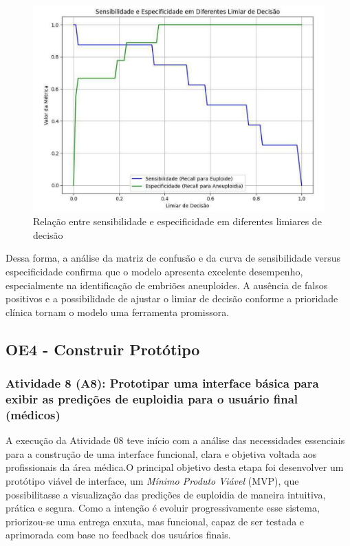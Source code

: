 \begin{figure}[h]
    \captionsetup{font=footnotesize, justification=centering, labelsep=period, position=above}
    \centering
    \includegraphics[scale=0.45]{figuras/IA/sensibilidade.pdf}
    \caption{Relação entre sensibilidade e especificidade em diferentes limiares de decisão}
    \label{fig:sensibilidade}
\end{figure}
\FloatBarrier

Dessa forma, a análise da matriz de confusão e da curva de sensibilidade versus especificidade confirma que o modelo apresenta excelente desempenho, especialmente na identificação de embriões aneuploides. A ausência de falsos positivos e a possibilidade de ajustar o limiar de decisão conforme a prioridade clínica tornam o modelo uma ferramenta promissora.

\subsection{OE4 - Construir Protótipo}
\subsubsection{Atividade 8 (A8): Prototipar uma interface básica para exibir as predições de euploidia para o usuário final (médicos)}
A execução da Atividade 08 teve início com a análise das necessidades essenciais para a construção de uma interface funcional, clara e objetiva voltada aos profissionais da área médica.O principal objetivo desta etapa foi desenvolver um protótipo viável de interface, um \textit{Mínimo Produto Viável} (MVP), que possibilitasse a visualização das predições de euploidia de maneira intuitiva, prática e segura. Como a intenção é evoluir progressivamente esse sistema, priorizou-se uma entrega enxuta, mas funcional, capaz de ser testada e aprimorada com base no feedback dos usuários finais.

